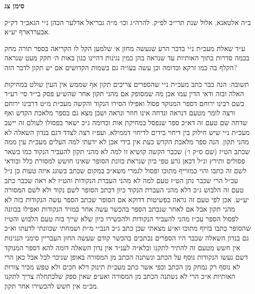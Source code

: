 \documentclass[12pt, openany]{book}
\newcommand{\chapname}{}
\newcommand{\newchap}[1]{
	\addcontentsline{toc}{chapter}{#1}
	\renewcommand{\chapname}{#1}
		\begin{center}
			\textbf{%
\fontsize{16pt}{16pt}\selectfont
				#1}
		\end{center}
}
\begin{document}
\newchap{סימן צג}
\begin{multicols}{2}
ב״ה אלטאנא, אלול שנת תרי״ב לפ״ק. להרה״ג וכו׳ מ״ה גבריאל אדלער הכהן נ״י הגאב״ד דק״ק אבערדארף יע״א.\\\vspace{0pt}

ע״ד שאלת מעכ״ת נ״י בדבר הרע שנעשה מחזן א׳ שלמען הקל לו הקריאה בספר תורה מחק בכמה סדרות בתוך האותיות עד שנראה בהן כמין נגינות דהיינו כגון באות ה׳ חקק מעט שנראה הקלף בה כמו זרקא וכדומה וכן עשה בעו״ה גם בשמות הקדושים אם יש תקון לדבר הזה?\\\vspace{0pt}

תשובה: הנה כבר כתב מעכ״ת נ״י שהספרים צריכים תקון אף שממש אין העין שולט במחיקות האלה ובזה ודאי הדין עמו אכן מה שמסופק אם מהני תקון אחר שהש״ע פסק בי״ד סי׳ רע״ד בשם רבינו ירוחם דספר המנוקד פסול ואפילו הסירו הנקוד והקשה מעכ״ת מ״ט דרבינו ירוחם ורצה לומר מטעם דנראה ונדחה אינו חוזר ונראה ושכן מצא גם בספר מלאכת הקדש ואף שדחה שם טעם זה דא״כ ספר שנפסל במחיקת אות וכדומה ג״כ ישאר בפסולו לעולם זה יישב מעכ״ת נ״י שיש חילוק בין דיחוי בידים לדיחוי דממילא, ועפ״ז רצה לצדד דגם בנדון השאלה לא מהני תקון. הנה ספר מלאכת הקדש כעת אין בידי אכן לא ידעתי למה העלים מעכ״ת עין ממה שכתב הט״ז (שם ס״ק ו׳) שכבר הקשה קושיא זו למה לא מהני תקון להעביר הנקוד כמו בשאר פסולים ותירץ ונ״ל דכאן גרע טפי כיון שנראת כוונת הסופר שאינו חושש למסורת כלל ובודאי לשם זה כתבו והוי כמזוייף מתוכו ופסול לגמרי משא״כ במקום שכתב בשוגג איזה טעות כן נ״ל עכ״ל הרי שכבר נתן הט״ז טעם למה לא מהני העברת הנקודות והט״ז לא ראה שכבר כתב טעם זה הלבוש ג״כ דלא מהני העברת הנקוד כיון דכתב הסופר לשם נקוד ולא לשם המסורה יע״ש. אכן לפי טעם זה נראה בפשיטות דדוקא אם הסופר שכתב הספר עשה הנקודות בזה לא מהני תקון אבל אם לאחר שנכתב הספר בהכשר עשה אחר במזיד הנקודות ואפילו בכוונה לפסול הספר עכ״ז מהני להעביר הנקודות ולהכשירו כיון שלא שייך בזה טעם הלבוש והט״ז שהסופר כתבו בזיוף מתוכו וא״ע מצאתי שכן כתב ג״כ הנב״י מ״ת ושמחתי שכוונתי לדעתו וא״כ גם בנדון השאלה שכבר היו הספרים נכתבים בהכשר קודם שעשה החזן העבריין סימני הנגינות אין חשש מטעם זה להתיר לתקנו ובלא״ה לענ״ד אין נדון השאלה דומה להא דספר המנוקד דשם נעשו הנקודות נוסף על הכתב ונשתנה הכתב מן המסורה באופן שניכר לכל אבל כאן הרי לא נוסף רק נמחק מן הכתב וכפי אשר כתב מעכ״ת תינוק דלא חכים ולא טפש מכיר צורות האותיות א״כ הרי לא נשתנה הכתב מן המסורה ואע״פ שאין ספק שלכתחלה צריך לתקנו מכ״מ אין חשש להכשירו אחר תקון.\\\vspace{0pt}


\end{multicols}
\end{document}
